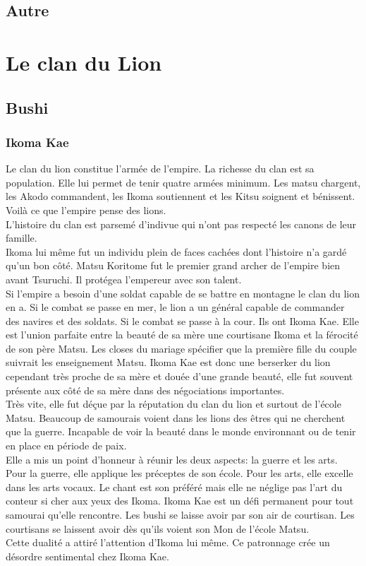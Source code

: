 \documentclass[10pt,a4paper]{book}
\begin{document}
\section{Autre}


\chapter{Le clan du Lion}

\section{Bushi}
\subsection{Ikoma Kae}

Le clan du lion constitue l’armée de l’empire. La richesse du clan est sa population. 
Elle lui permet de tenir quatre armées minimum. Les matsu chargent, les Akodo commandent, les Ikoma soutiennent et les Kitsu soignent et bénissent.
Voilà ce que l’empire pense des lions. \\
L’histoire du clan est parsemé d’indivue qui n’ont pas respecté les canons de leur famille. \\
Ikoma lui même fut un individu plein de faces cachées dont l’histoire n’a gardé qu’un bon côté. 
Matsu Koritome fut le premier grand archer de l’empire bien avant Tsuruchi. Il protégea l’empereur avec son talent.\\
Si l’empire a besoin d’une soldat capable de se battre en montagne le clan du lion en a. 
Si le combat se passe en mer, le lion a un général capable de commander des navires et des soldats. 
Si le combat se passe à la cour. Ils ont Ikoma Kae. Elle est l’union parfaite entre la beauté de sa mère une courtisane Ikoma et la férocité de son père Matsu.
Les closes du mariage spécifier que la première fille du couple suivrait les enseignement Matsu.
Ikoma Kae est donc une berserker du lion cependant très proche de sa mère et douée d’une grande beauté, elle fut souvent présente aux côté de sa mère dans des négociations importantes.\\
Très vite, elle fut déçue par la réputation du clan du lion et surtout de l’école Matsu. 
Beaucoup de samourais voient dans les lions des êtres qui ne cherchent que la guerre. 
Incapable de voir la beauté dans le monde environnant ou de tenir en place en période de paix.\\
Elle a mis un point d’honneur à réunir les deux aspects: la guerre et les arts.\\
Pour la guerre, elle applique les préceptes de son école. Pour les arts, elle excelle dans les arts vocaux. Le chant est son préféré mais elle ne néglige pas l’art du conteur si cher aux yeux des Ikoma.
Ikoma Kae est un défi permanent pour tout samourai qu’elle rencontre. Les bushi se laisse 
avoir par son air de courtisan. Les courtisans se laissent avoir dès qu’ils voient son Mon 
de l’école Matsu.\\
Cette dualité a attiré l’attention d’Ikoma lui même. Ce patronnage crée un désordre sentimental chez Ikoma Kae.
\end{document}
